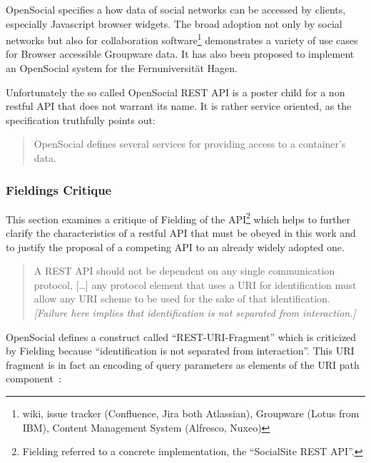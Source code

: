 \documentclass[12pt,a4paper,twoside]{scrartcl}		%
\begin{document}

OpenSocial\cite{OSSpec2.0.1} specifies a how data of social networks can be
accessed by clients, especially Javascript browser widgets. The broad adoption
not only by social networks but also for collaboration software\footnote{wiki,
  issue tracker (Confluence, Jira both Atlassian), Groupware (Lotus from IBM),
  Content Management System (Alfresco, Nuxeo)} demonstrates a variety of use
cases for Browser accessible Groupware data. It has also been proposed to
implement an OpenSocial system for the Fernuniversität Hagen\cite{Huebner2009}.

Unfortunately the so called OpenSocial REST API is a poster child for a non
restful API that does not warrant its name. It is rather service oriented, as
the specification truthfully points out\cite[Social API Server, sec
2,Services]{OSSpec2.0.1}:
\begin{quote}
  OpenSocial defines several services for providing access to a container's data.
\end{quote}

\subsubsection{Fieldings Critique}
\label{sec:fieldings-critique}

This section examines a critique of Fielding of the
API\cite{Fielding2008}\footnote{Fielding referred to a concrete implementation,
  the ``SocialSite REST API''.} which helps to further clarify the
characteristics of a restful API that must be obeyed in this work and to justify
the proposal of a competing API to an already widely adopted one.

\begin{quote}
  A REST API should not be dependent on any single communication protocol,
  [\ldots] any protocol element that uses a URI for identification must allow
  any URI scheme to be used for the sake of that identification.
  \textit{[Failure here implies that identification is not separated from
    interaction.]}
\end{quote}

OpenSocial defines a construct called ``REST-URI-Fragment'' which is criticized
by Fielding because ``identification is not separated from interaction''.  This
URI fragment is in fact an encoding of query parameters as elements of the URI
path component~\cite[Core API Server, sec 2.1.1.2.2,
REST-URI-Fragment]{OSSpec2.0.1}:
\end{document}
